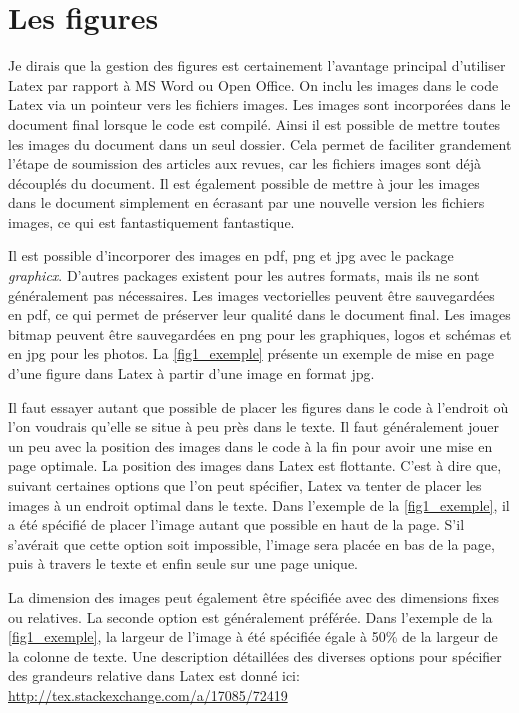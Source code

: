 \documentclass[exemple_master.tex]{subfiles}
\begin{document}
\section{Les figures}

Je dirais que la gestion des figures est certainement l'avantage principal d'utiliser Latex par rapport à MS Word ou Open Office. On inclu les images dans le code Latex via un pointeur vers les fichiers images. Les images sont incorporées dans le document final lorsque le code est compilé. Ainsi il est possible de mettre toutes les images du document dans un seul dossier. Cela permet de faciliter grandement l'étape de soumission des articles aux revues, car les fichiers images sont déjà découplés du document. Il est également possible de mettre à jour les images dans le document simplement en écrasant par une nouvelle version les fichiers images, ce qui est fantastiquement fantastique.

Il est possible d'incorporer des images en pdf, png et jpg avec le package \emph{graphicx}. D'autres packages existent pour les autres formats, mais ils ne sont généralement pas nécessaires. Les images vectorielles peuvent être sauvegardées en pdf, ce qui permet de préserver leur qualité dans le document final. Les images bitmap peuvent être sauvegardées en png pour les graphiques, logos et schémas et en jpg pour les photos. La \cref{fig1_exemple} présente un exemple de mise en page d'une figure dans Latex à partir d'une image en format jpg.

Il faut essayer autant que possible de placer les figures dans le code à l'endroit où l'on voudrais qu'elle se situe à peu près dans le texte. Il faut généralement jouer un peu avec la position des images dans le code à la fin pour avoir une mise en page optimale. La position des images dans Latex est flottante. C'est à dire que, suivant certaines options que l'on peut spécifier, Latex va tenter de placer les images à un endroit optimal dans le texte. Dans l'exemple de la \cref{fig1_exemple}, il a été spécifié de placer l'image autant que possible en haut de la page. S'il s'avérait que cette option soit impossible, l'image sera placée en bas de la page, puis à travers le texte et enfin seule sur une page unique.

La dimension des images peut également être spécifiée avec des dimensions fixes ou relatives. La seconde option est généralement préférée. Dans l'exemple de la \cref{fig1_exemple}, la largeur de l'image à été spécifiée égale à 50\% de la largeur de la colonne de texte. Une description détaillées des diverses options pour spécifier des grandeurs relative dans Latex est donné ici: \url{http://tex.stackexchange.com/a/17085/72419}
\end{document}
